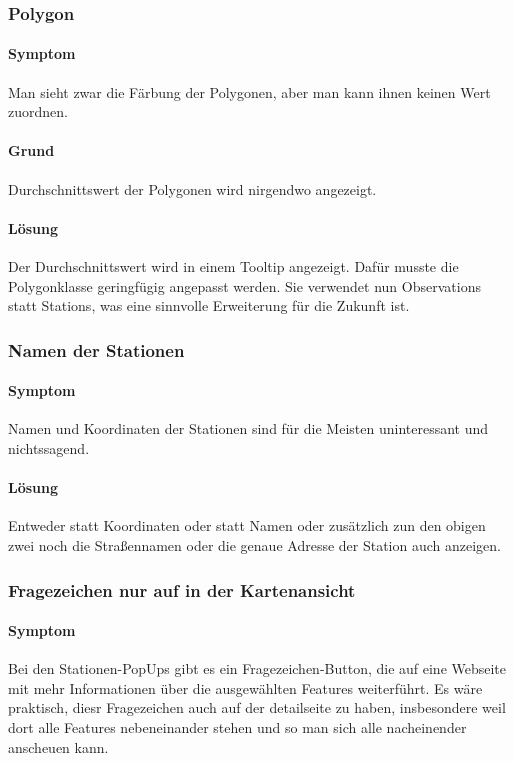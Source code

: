 \subsubsection{Polygon}
\paragraph{Symptom}

Man sieht zwar die Färbung der Polygonen, aber man kann ihnen keinen Wert zuordnen.


\paragraph{Grund}
Durchschnittswert der Polygonen wird nirgendwo angezeigt.

\paragraph{Lösung}
Der Durchschnittswert wird in einem Tooltip angezeigt. Dafür musste die Polygonklasse geringfügig
angepasst werden. Sie verwendet nun Observations statt Stations, was eine sinnvolle Erweiterung für die Zukunft ist.


\subsubsection{Namen der Stationen}
\paragraph{Symptom}

Namen und Koordinaten der Stationen sind für die Meisten uninteressant und nichtssagend.
 

\paragraph{Lösung}
Entweder statt Koordinaten oder statt Namen oder zusätzlich zun den obigen zwei noch die Straßennamen oder die genaue Adresse der Station auch anzeigen.

\subsubsection{Fragezeichen nur auf in der Kartenansicht}
\paragraph{Symptom}
Bei den Stationen-PopUps gibt es ein Fragezeichen-Button, die auf eine Webseite mit mehr Informationen über die ausgewählten Features weiterführt. Es wäre praktisch, diesr Fragezeichen auch auf der detailseite zu haben, insbesondere weil dort alle Features nebeneinander stehen und so man sich alle nacheinender anscheuen kann.

